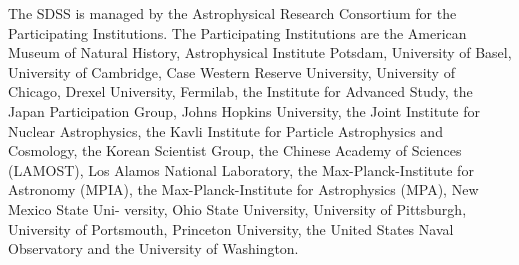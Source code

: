 \documentclass[usenatbib]{mn2e}
\begin{document}
The SDSS is managed by the Astrophysical Research Consortium for the Participating Institutions. The Participating Institutions are the American Museum of Natural History, Astrophysical  Institute Potsdam, University of Basel, University of Cambridge, 
Case Western Reserve University, University of Chicago, Drexel University, Fermilab, the Institute for Advanced Study, the Japan 
Participation Group, Johns Hopkins University, the Joint Institute for Nuclear Astrophysics, the Kavli Institute for Particle Astrophysics and Cosmology, the Korean Scientist Group, the Chinese Academy of Sciences (LAMOST), Los Alamos National Laboratory, the Max-Planck-Institute for Astronomy (MPIA), the Max-Planck-Institute for Astrophysics (MPA), New Mexico State Uni- 
versity, Ohio State University, University of Pittsburgh, University of Portsmouth, Princeton University, the United States Naval Observatory and the University of Washington. 



\end{document}
